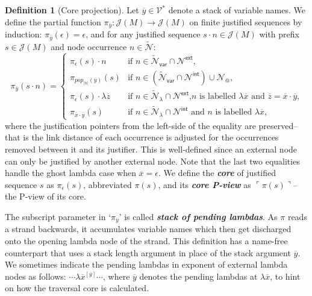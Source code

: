\documentclass[xchauthor,chkrefs,GCNS,amsmath,amsthm,rotating,leaveRGB]{tcsg}
\makeatletter
\renewcommand{\index}[1]{}
\theoremstyle{plain}
\theoremstyle{definition}
\newtheorem{definition}{Definition}[section]
\newcommand{\VarSet}{\mathcal{V}}
\newcommand{\Nodes}{\mathcal{N}}
\newcommand{\NodesApp}{\Nodes_@}
\newcommand{\ExtendedNodes}{\tilde{\Nodes}}
\newcommand{\ExtendedNodesVar}{\tilde{\Nodes}_{\mathsf{var}}}
\newcommand{\ExtendedNodesLmd}{\tilde{\Nodes}_{\lambda}}
\def\coresymbol{\pi}
\newcommand{\core}[1]{\coresymbol(#1)}
\newcommand{\ExternalNodes}{\Nodes^{\mathsf{ext}}}
\newcommand{\InternalNodes}{\Nodes^{\mathsf{int}}}
\def\justseqset{\mathcal{J}}
\makeatother
\begin{document}
\begin{definition}[Core projection]\label{def:coreprojection}
Let $\overline{y} \in \VarSet ^{*}$ denote a stack of variable names. We
define the partial function $\coresymbol _{\overline{y}}\colon \justseqset
(M) \longrightarrow \justseqset (M)$ on finite justified sequences by
induction: $\coresymbol _{\overline{y}}(\epsilon ) = \epsilon $, and for any
justified sequence $s \cdot n\in \justseqset (M)$ with prefix $s \in
\justseqset (M)$ and node occurrence $n\in \ExtendedNodes $:
%
\begin{equation*}
\coresymbol _{\overline{y}}(s\cdot n) =
\begin{cases}
\coresymbol _{\epsilon }(s) \cdot n    & \mbox{if } n\in \ExtendedNodesVar \cap  \ExternalNodes , \\
\coresymbol _{pop_{|n|}(\overline{y})}(s)    & \mbox{if } n\in (\ExtendedNodesVar \cap  \InternalNodes )\cup  \NodesApp , \\
\coresymbol _{\epsilon }(s) \cdot \lambda \overline{z}    & \mbox{if $n  \in \ExtendedNodesLmd \cap  \ExternalNodes $,
$n$ is labelled $\lambda \overline{x}$ and $\overline{z}=\overline{x}\cdot \overline{y}$,} \\
\coresymbol _{\overline{x} \cdot \overline{y}}(s)    & \mbox{if $n \in \ExtendedNodesLmd \cap  \InternalNodes $ and $n$ is labelled $\lambda \overline{x}$,}
\end{cases}
\end{equation*}
%
where the justification pointers from the left-side of the equality are
preserved--that is the link distance of each occurrence is adjusted for the
occurrences removed between it and its justifier. This is well-defined since
an external node can only be justified by another external node. Note that
the last two equalities handle the ghost lambda case when
$\overline{x}=\epsilon $. We define the \textbf{\emph{core}}\index{core} of
justified sequence $s$ as $\coresymbol _\epsilon (s)$, abbreviated
$\core{s}$, and its \textbf{\emph{core P-view}}\index{core P-view} as
$\ulcorner  \core {s} \urcorner  $--the P-view of its core.
\end{definition}

The subscript parameter in `$\coresymbol _{\overline{y}}$' is called
\textbf{\emph{stack of pending lambdas}}\index{stack of pending lambdas}. As
$\coresymbol $ reads a strand backwards, it accumulates variable names which
then get discharged onto the opening lambda node of the strand. This
definition has a name-free counterpart that uses a stack length argument in
place of the stack argument $\overline{y}$. We sometimes indicate the pending
lambdas in exponent of external lambda nodes as follows: $\cdots  \lambda
\overline{x}^{[\overline{y}]} \cdots $, where $\overline{y}$ denotes the
pending lambdas at $\lambda \overline{x}$, to hint on how the traversal core
is calculated.
\end{document}

